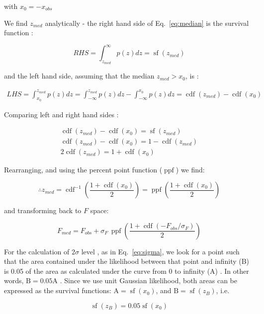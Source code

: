 \documentclass[fleqn,usenatbib]{mnras}  %
\DeclareMathOperator\cdf{cdf}
\DeclareMathOperator\sf{sf}
\DeclareMathOperator\ppf{ppf}
\begin{document}
with  $x_{0}=-x_{obs}$

\bigskip

We find  $z_{med}$ analytically  - the right hand side of Eq.~\ref{eq:median} is the survival function  : 

\begin{equation}
RHS = \int_{z_{med}}^{\infty}{p(z)dz} = \sf(z_{med})
\end{equation}

and the left hand side, assuming that the median $z_{med} > x_{0}$, is :

\begin{multline}
LHS = \int_{x_{0}}^{z_{med}}{p(z)dz} = \int_{-\infty}^{z_{med}}{p(z)dz} - \int_{-\infty}^{x_{0}}{p(z)dz} = \cdf(z_{med}) - \cdf(x_{0})
\end{multline}

Comparing left and right hand sides : 

\begin{multline}
\cdf(z_{med}) - \cdf(x_{0}) = \sf(z_{med}) \\
\cdf(z_{med}) - \cdf(x_{0}) = 1 - \cdf(z_{med}) \\
2 \cdf(z_{med}) = 1 + \cdf(x_{0}) 
\end{multline}

Rearranging, and using the percent point function ($\ppf$)  we find:


\begin{equation}
\therefore z_{med} = \cdf^{-1} \left(  \frac{1 + \cdf(x_{0})   }{2}   \right) = \ppf \left(  \frac{1 + \cdf(x_{0})   }{2}   \right)
\end{equation}

and transforming back to $F$ space: 

\begin{equation}
F_{med} = F_{obs} + \sigma_{F} \, \ppf \left( \frac{1+\cdf( - F_{obs} / \sigma_{F})}{2} \right)
\end{equation}


For the calculation of $2 \sigma$ level , as in Eq.~\ref{eq:sigma}, we look for a point such that the area contained under the likelihood between that point and infinity (B)  is 0.05 of the area as calculated under the curve from 0 to infinity (A) . In other words,  $\text{B} = 0.05 \text{A}$  . Since we use unit Gaussian likelihood, both areas can be expressed as the survival functions:  $\text{A}= \sf (x_{0})$, and  $\text{B} = \sf(z_{B})$, i.e.  

\begin{equation}
 \sf(z_{B}) = 0.05  \sf (x_{0})
\end{equation}
\end{document}
